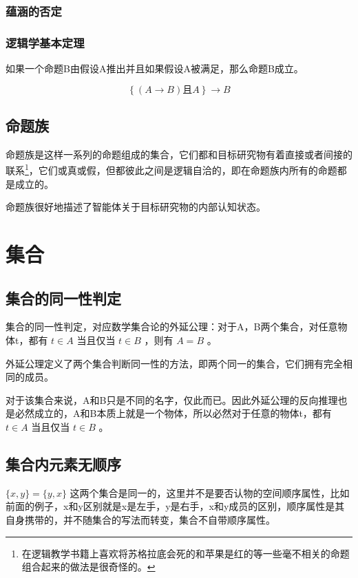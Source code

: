 \documentclass[12pt,oneside]{book}
\begin{document}
\subsubsection{蕴涵的否定}

\subsubsection{逻辑学基本定理}
如果一个命题B由假设A推出并且如果假设A被满足，那么命题B成立。

\begin{equation}
\left\{(A \rightarrow B) \text{且} A\right\} \rightarrow B
\end{equation}

\subsection{命题族}
命题族是这样一系列的命题组成的集合，它们都和目标研究物有着直接或者间接的联系\footnote{在逻辑教学书籍上喜欢将苏格拉底会死的和苹果是红的等一些毫不相关的命题组合起来的做法是很奇怪的。}，它们或真或假，但都彼此之间是逻辑自洽的，即在命题族内所有的命题都是成立的。

命题族很好地描述了智能体关于目标研究物的内部认知状态。




\section{集合}
\subsection{集合的同一性判定}
集合的同一性判定，对应数学集合论的外延公理：对于A，B两个集合，对任意物体t，都有 $t \in A$ 当且仅当 $t \in B$ ，则有 $A=B$ 。

外延公理定义了两个集合判断同一性的方法，即两个同一的集合，它们拥有完全相同的成员。

对于该集合来说，A和B只是不同的名字，仅此而已。因此外延公理的反向推理也是必然成立的，A和B本质上就是一个物体，所以必然对于任意的物体t，都有 $t \in A$ 当且仅当 $t \in B$ 。


\subsection{集合内元素无顺序}
$\{x, y\} =\{y, x\}$ 这两个集合是同一的，这里并不是要否认物的空间顺序属性，比如前面的例子，x和y区别就是x是左手，y是右手，x和y成员的区别，顺序属性是其自身携带的，并不随集合的写法而转变，集合不自带顺序属性。
\end{document}

